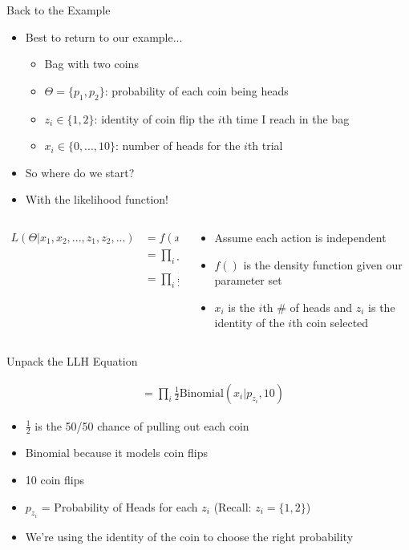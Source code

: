 \documentclass[aspectratio=169]{beamer}
\begin{document}
\begin{frame}{Back to the Example}

\begin{itemize}
\item Best to return to our example...
	\begin{itemize}
	\item Bag with two coins
	\item $\Theta = \{p_1, p_2\}$: probability of each coin being heads
	\item $z_i \in \{1, 2\}$: identity of coin flip the $i$th time I reach in the bag
	\item $x_i \in \{0, ..., 10\}$: number of heads for the $i$th trial
	\end{itemize}
\item So where do we start?
\item With the likelihood function!
\end{itemize}
\begin{columns}[T]
\begin{column}{0.5\textwidth}
	\begin{align}
	L (\Theta | x_1, x_2, ..., z_1, z_2, ...) &= f (x_1, x_2, ..., z_1, z_2, ... | \Theta) \nonumber \\
		&= \prod_i f (x_i, z_i | \Theta) \nonumber \\
		&= \prod_i \frac{1}{2} \textrm {Binomial}(x_i | p_{z_i}, 10) \nonumber
	\end{align}
\end{column}
\begin{column}{0.5\textwidth}
\begin{itemize}
\item Assume each action is independent %
\item $f()$ is the density function given our parameter set
\item $x_i$ is the $i$th \# of heads and $z_i$ is the identity of the $i$th coin selected
\end{itemize}
\end{column}
\end{columns}

		\end{frame}
\begin{frame}{Unpack the LLH Equation}

	\begin{align}
		&= \prod_i \frac{1}{2} \textrm {Binomial}(x_i | p_{z_i}, 10) \nonumber
	\end{align}
\begin{itemize}
\item $\frac{1}{2}$ is the 50/50 chance of pulling out each coin 
\item Binomial because it models coin flips 
\item 10 coin flips
\item $p_{z_i}$ = Probability of Heads for each $z_i$ (Recall: $z_i = \{1,2\}$)
\item We're using the identity of the coin to choose the right probability
\end{itemize}
\end{frame}
\end{document}
